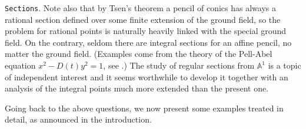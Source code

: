 \documentclass[leqno,12pt]{article} %
\def\A{{{\mathbb A}}}
\theoremstyle{plain} %
\theoremstyle{definition} %
\begin{document}
\smallskip

{\tt Sections}. Note also that by Tsen's theorem a pencil of conics has always a rational section defined over some finite extension of the ground field, so the problem for rational points is naturally  heavily  linked with  the special ground field. On the contrary, seldom there are integral sections for an affine pencil, no matter the ground field. (Examples come from the theory of the Pell-Abel equation $x^2-D(t)y^2=1$, see \cite{Zpell}.)  The study of regular sections from $\A^1$ is a topic of independent interest and it seems worthwhile to develop it together with an analysis  of the integral points much more extended than the present one.


\smallskip

 
\medskip

Going back to the above questions, we now present some examples treated in detail, as announced in the introduction.

\medskip
\end{document}
